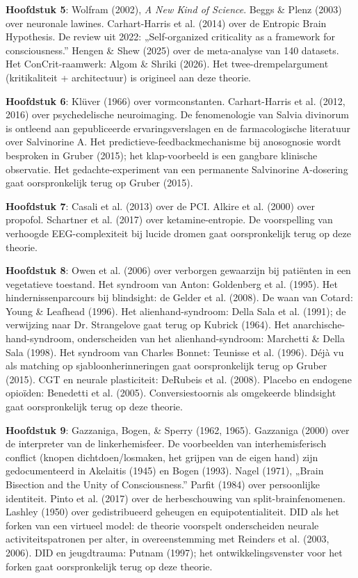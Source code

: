 \documentclass[11pt, twoside, openright]{book}
\begin{document}
\textbf{Hoofdstuk 5}: Wolfram (2002), \textit{A New Kind of Science}. Beggs \& Plenz (2003) over neuronale lawines. Carhart-Harris et al. (2014) over de Entropic Brain Hypothesis. De review uit 2022: „Self-organized criticality as a framework for consciousness.” Hengen \& Shew (2025) over de meta-analyse van 140 datasets. Het ConCrit-raamwerk: Algom \& Shriki (2026). Het twee-drempelargument (kritikaliteit + architectuur) is origineel aan deze theorie.

\textbf{Hoofdstuk 6}: Klüver (1966) over vormconstanten. Carhart-Harris et al. (2012, 2016) over psychedelische neuroimaging. De fenomenologie van Salvia divinorum is ontleend aan gepubliceerde ervaringsverslagen en de farmacologische literatuur over Salvinorine A. Het predictieve-feedbackmechanisme bij anosognosie wordt besproken in Gruber (2015); het klap-voorbeeld is een gangbare klinische observatie. Het gedachte-experiment van een permanente Salvinorine A-dosering gaat oorspronkelijk terug op Gruber (2015).

\textbf{Hoofdstuk 7}: Casali et al. (2013) over de PCI. Alkire et al. (2000) over propofol. Schartner et al. (2017) over ketamine-entropie. De voorspelling van verhoogde EEG-complexiteit bij lucide dromen gaat oorspronkelijk terug op deze theorie.

\textbf{Hoofdstuk 8}: Owen et al. (2006) over verborgen gewaarzijn bij patiënten in een vegetatieve toestand. Het syndroom van Anton: Goldenberg et al. (1995). Het hindernissenparcours bij blindsight: de Gelder et al. (2008). De waan van Cotard: Young \& Leafhead (1996). Het alienhand-syndroom: Della Sala et al. (1991); de verwijzing naar Dr. Strangelove gaat terug op Kubrick (1964). Het anarchische-hand-syndroom, onderscheiden van het alienhand-syndroom: Marchetti \& Della Sala (1998). Het syndroom van Charles Bonnet: Teunisse et al. (1996). Déjà vu als matching op sjabloonherinneringen gaat oorspronkelijk terug op Gruber (2015). CGT en neurale plasticiteit: DeRubeis et al. (2008). Placebo en endogene opioïden: Benedetti et al. (2005). Conversiestoornis als omgekeerde blindsight gaat oorspronkelijk terug op deze theorie.

\textbf{Hoofdstuk 9}: Gazzaniga, Bogen, \& Sperry (1962, 1965). Gazzaniga (2000) over de interpreter van de linkerhemisfeer. De voorbeelden van interhemisferisch conflict (knopen dichtdoen/\allowbreak{}losmaken, het grijpen van de eigen hand) zijn gedocumenteerd in Akelaitis (1945) en Bogen (1993). Nagel (1971), „Brain Bisection and the Unity of Consciousness.” Parfit (1984) over persoonlijke identiteit. Pinto et al. (2017) over de herbeschouwing van split-brainfenomenen. Lashley (1950) over gedistribueerd geheugen en equipotentialiteit. DID als het forken van een virtueel model: de theorie voorspelt onderscheiden neurale activiteitspatronen per alter, in overeenstemming met Reinders et al. (2003, 2006). DID en jeugdtrauma: Putnam (1997); het ontwikkelingsvenster voor het forken gaat oorspronkelijk terug op deze theorie.
\end{document}
